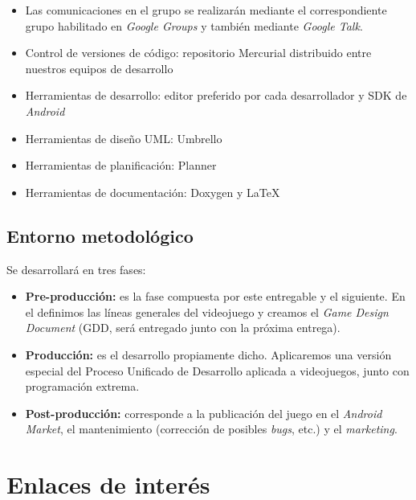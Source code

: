 \begin{itemize}

\item Las comunicaciones en el grupo se realizarán mediante el correspondiente grupo
habilitado en {\em Google Groups} y también mediante {\em Google Talk}.

\item Control de versiones de código: repositorio Mercurial distribuido entre
nuestros equipos de desarrollo

\item Herramientas de desarrollo: editor preferido por cada desarrollador y SDK
de {\em Android}

\item Herramientas de diseño UML: Umbrello

\item Herramientas de planificación: Planner

\item Herramientas de documentación: Doxygen y \LaTeX{}

\end{itemize}

\subsection{Entorno metodológico}

Se desarrollará en tres fases:

\begin{itemize}

\item {\bf Pre-producción:} es la fase compuesta por este entregable y el
siguiente. En el definimos las líneas generales del videojuego y creamos el
{\em Game Design Document} (GDD, será entregado junto con la próxima entrega).

\item {\bf Producción:} es el desarrollo propiamente dicho. Aplicaremos una
versión especial del Proceso Unificado de Desarrollo aplicada a videojuegos,
junto con programación extrema.

\item {\bf Post-producción:} corresponde a la publicación del juego en el {\em
Android Market}, el mantenimiento (corrección de posibles {\em bugs}, etc.) y
el {\em marketing}.

\end{itemize}

\section{Enlaces de interés}

